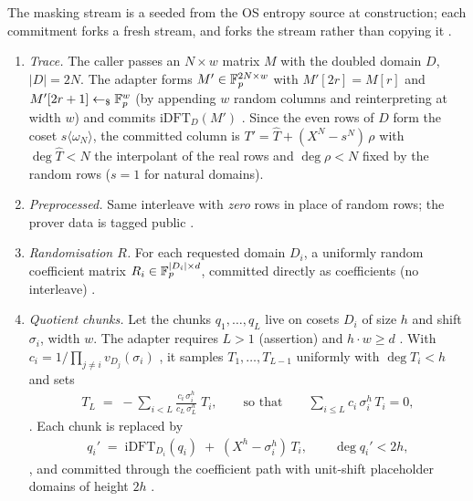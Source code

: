 \begin{definition}[Hiding commitment, $\code{ZK}=\code{true}$]
\label{def:ps-commit1}
The masking stream is a  seeded from the OS entropy source at
construction; each commitment forks a fresh stream, and  forks the
stream rather than copying it .
\begin{enumerate}
\item \emph{Trace.} The caller passes an $N\times w$ matrix $M$ with the doubled
  domain $D$, $|D| = 2N$. The adapter forms $M' \in \mathbb{F}_p^{2N\times w}$ with
  $M'[2r] = M[r]$ and $M'[2r+1] \leftarrow_{\$} \mathbb{F}_p^{w}$ (by appending $w$ random
  columns and reinterpreting at width $w$) and commits
  $\mathrm{iDFT}_{D}(M')$ . Since the even rows of $D$ form
  the coset $s\langle\omega_N\rangle$, the committed column is
  $T' = \hat T + (X^N - s^N)\,\rho$ with $\deg \hat T < N$ the interpolant of the
  real rows and $\deg\rho < N$ fixed by the random rows ($s=1$ for natural
  domains).
\item \emph{Preprocessed.} Same interleave with \emph{zero} rows in place of
  random rows; the prover data is tagged public .
\item \emph{Randomisation $R$.} For each requested domain $D_i$, a uniformly
  random coefficient matrix $R_i \in \mathbb{F}_p^{|D_i|\times d}$, committed directly as
  coefficients (no interleave) .
\item \emph{Quotient chunks.} Let the chunks $q_1,\dots,q_L$ live on cosets $D_i$
  of size $h$ and shift $\sigma_i$, width $w$. The adapter requires $L > 1$
  (assertion) and $h\cdot w \ge d$ . With
  $c_i = 1/\prod_{j\ne i} v_{D_j}(\sigma_i)$ , it samples
  $T_1,\dots,T_{L-1}$ uniformly with $\deg T_i < h$ and sets
  \begin{align}
    T_L \;=\; -\sum_{i<L} \frac{c_i\,\sigma_i^{h}}{c_L\,\sigma_L^{h}}\; T_i ,
    \qquad\text{so that}\qquad \sum_{i\le L} c_i\, \sigma_i^{h}\, T_i = 0,
  \end{align}
  . Each chunk is replaced by
  \begin{align}
    q_i' \;=\; \mathrm{iDFT}_{D_i}(q_i) \;+\; (X^{h} - \sigma_i^{h})\, T_i,
    \qquad \deg q_i' < 2h,
  \end{align}
  , and committed through the coefficient path with
  unit-shift placeholder domains of height $2h$ .
\end{enumerate}
\end{definition}

